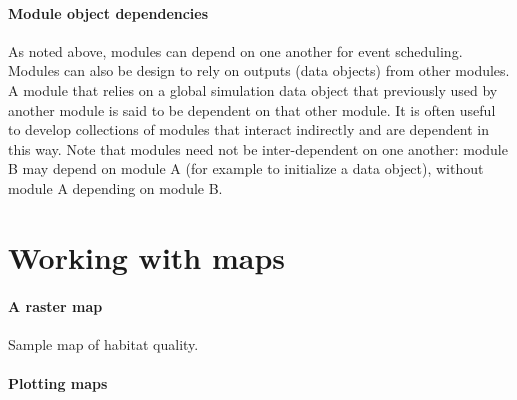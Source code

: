\documentclass{article}
\begin{document}
\paragraph{Module object dependencies}
As noted above, modules can depend on one another for event scheduling. Modules can also be design to rely on outputs (data objects) from other modules. A module that relies on a global simulation data object that previously used by another module is said to be dependent on that other module. It is often useful to develop collections of modules that interact indirectly and are dependent in this way. Note that modules need not be inter-dependent on one another: module B may depend on module A (for example to initialize a data object), without module A depending on module B.

\newpage

\section{Working with maps}

\paragraph{A raster map}
Sample map of habitat quality.

\paragraph{Plotting maps}
\end{document}
